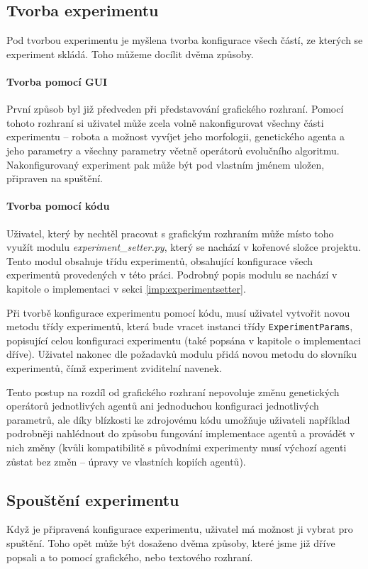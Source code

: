 \subsection{Tvorba experimentu} \label{doc_21_mise_en_place}

Pod tvorbou experimentu je myšlena tvorba konfigurace všech částí, ze kterých
se experiment skládá. Toho můžeme docílit dvěma způsoby. 

\paragraph{Tvorba pomocí GUI}
První způsob byl již předveden při představování grafického rozhraní.
Pomocí tohoto rozhraní si uživatel může zcela volně nakonfigurovat všechny
části experimentu -- robota a možnost vyvíjet jeho morfologii, genetického
agenta a jeho parametry a všechny parametry včetně operátorů evolučního
algoritmu. Nakonfigurovaný experiment pak může být pod vlastním jménem uložen,
připraven na spuštění.

\paragraph{Tvorba pomocí kódu}
Uživatel, který by nechtěl pracovat s grafickým rozhraním může místo toho
využít modulu \emph{experiment\_setter.py}, který se nachází v kořenové složce
projektu. Tento modul obsahuje třídu experimentů, obsahující konfigurace všech
experimentů provedených v této práci. Podrobný popis modulu se nachází v
kapitole o implementaci v sekci \ref{imp:experimentsetter}.

Při tvorbě konfigurace experimentu pomocí kódu, musí uživatel vytvořit novou
metodu třídy experimentů, která bude vracet instanci třídy
\texttt{ExperimentParams}, popisující celou konfiguraci experimentu (také
popsána v kapitole o implementaci dříve). Uživatel nakonec dle požadavků modulu
přidá novou metodu do slovníku experimentů, čímž experiment zviditelní navenek.

Tento postup na rozdíl od grafického rozhraní nepovoluje změnu genetických
operátorů jednotlivých agentů ani jednoduchou konfiguraci jednotlivých
parametrů, ale díky blízkosti ke zdrojovému kódu umožňuje uživateli například
podrobněji nahlédnout do způsobu fungování implementace agentů a provádět v
nich změny (kvůli kompatibilitě s původními experimenty musí výchozí agenti
zůstat bez změn -- úpravy ve vlastních kopiích agentů).

\subsection{Spouštění experimentu} \label{doc_22_cooking}
Když je připravená konfigurace experimentu, uživatel má možnost ji vybrat pro
spuštění. Toho opět může být dosaženo dvěma způsoby, které jsme již dříve
popsali a to pomocí grafického, nebo textového rozhraní.

